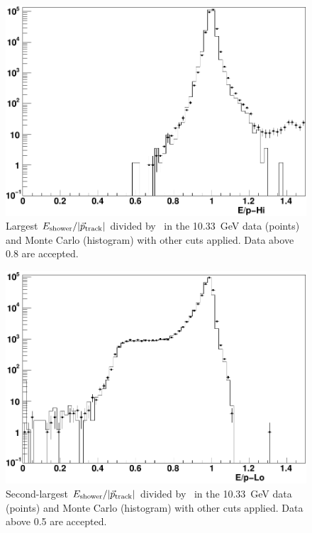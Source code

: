 \documentclass{cornell}
\begin{document}
\begin{figure}[p]
  \begin{center}
    \includegraphics[width=0.7\linewidth]{plots/eeagreementf}
  \end{center}
  \caption[Largest $E_\subs{shower}/|\vec{p}_\subs{track}|$ in Bhabha events]{\label{eeagreemente} Largest
  $E_\subs{shower}/|\vec{p}_\subs{track}|$ divided by \ebeam\ in the
  10.33~GeV data (points) and Monte Carlo (histogram) with other cuts
  applied.  Data above 0.8 are accepted.}
\end{figure}

\begin{figure}[p]
  \begin{center}
    \includegraphics[width=0.7\linewidth]{plots/eeagreementg}
  \end{center}
  \caption[Second-largest $E_\subs{shower}/|\vec{p}_\subs{track}|$ in Bhabha events]{\label{eeagreementf} Second-largest
  $E_\subs{shower}/|\vec{p}_\subs{track}|$ divided by \ebeam\ in the
  10.33~GeV data (points) and Monte Carlo (histogram) with other cuts
  applied.  Data above 0.5 are accepted.}
\end{figure}
\end{document}
